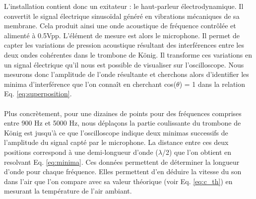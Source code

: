 L'installation contient donc un exitateur : le haut-parleur électrodynamique. Il convertit le signal électrique sinusoïdal généré en vibrations mécaniques de sa membrane. Cela produit ainsi une onde acoustique de fréquence contrôlée et alimenté à 0.5Vpp. L'élément de mesure est alors le microphone. Il permet de capter les variations de pression acoustique résultant des interférences entre les deux ondes cohérentes dans le trombone de König. Il transforme ces variations en un signal électrique qu'il nous est possible de visualiser sur l’oscilloscope. Nous mesurons donc l’amplitude de l’onde résultante et cherchons alors d’identifier les minima d’interférence que l'on connaît en cherchant cos($\theta$) = 1 dans la relation Eq. \ref{eq:superposition}.  \\\\

Plus concrètement, pour une dizaines de points pour des fréquences comprises entre 900 Hz et 5000 Hz, nous déplaçons la partie coulissante du trombone de König est jusqu’à ce que l’oscilloscope indique deux minimas successifs de l’amplitude du signal capté par le microphone. La distance entre ces deux positions correspond à une demi-longueur d’onde ($\lambda$/2) que l'on obtient en resolvant Eq. \ref{eq:minima}. Ces données permettent de déterminer la longueur d’onde pour chaque fréquence. Elles permettent d'en déduire la vitesse du son dans l'air que l'on compare avec sa valeur théorique (voir Eq. \ref{eq:c_th}) en mesurant la température de l'air ambiant.
